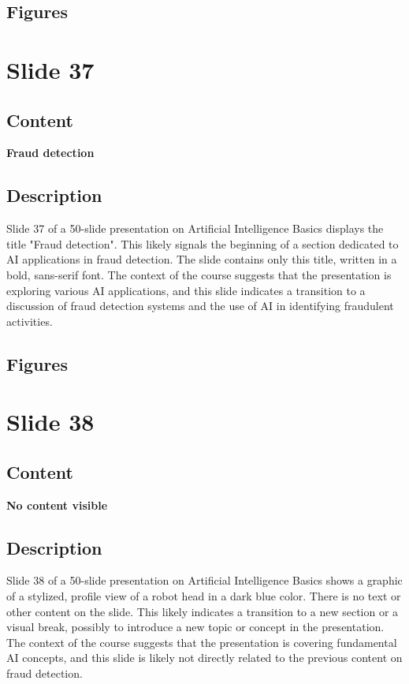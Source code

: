 \documentclass{article}%
\begin{document}
\subsection{Figures}%
\begin{figure}[H]%
\centering%
\end{figure}

%
\newpage%
\section{Slide 37}%
\label{sec:Slide37}%
\subsection{Content}%

\textbf{Fraud detection}
%
\subsection{Description}%
Slide 37 of a 50-slide presentation on Artificial Intelligence Basics displays the title "Fraud detection".  This likely signals the beginning of a section dedicated to AI applications in fraud detection.  The slide contains only this title, written in a bold, sans-serif font.  The context of the course suggests that the presentation is exploring various AI applications, and this slide indicates a transition to a discussion of fraud detection systems and the use of AI in identifying fraudulent activities.%
\subsection{Figures}%
\begin{figure}[H]%
\centering%
\end{figure}

%
\newpage%
\section{Slide 38}%
\label{sec:Slide38}%
\subsection{Content}%

\textbf{No content visible}
%
\subsection{Description}%

Slide 38 of a 50-slide presentation on Artificial Intelligence Basics shows a graphic of a stylized, profile view of a robot head in a dark blue color.  There is no text or other content on the slide.  This likely indicates a transition to a new section or a visual break, possibly to introduce a new topic or concept in the presentation.  The context of the course suggests that the presentation is covering fundamental AI concepts, and this slide is likely not directly related to the previous content on fraud detection.
%
\end{document}
